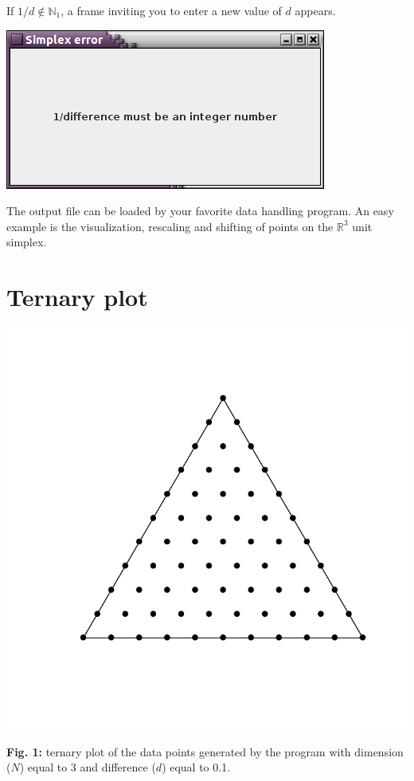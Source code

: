 \documentclass[12pt,a4paper]{article}
\begin{document}
If $1/d  \notin \mathbb{N}_1$, a frame inviting you to enter a new value of $d$ appears.

\vspace{1cm}
\centerline{\includegraphics[scale=0.6]{fig2.png}} 
\newpage
The output file can be loaded by your favorite data handling program. 
An easy example is the visualization, rescaling and shifting of points on the $\mathbb{R}^3$ unit simplex.

\section*{Ternary plot}
\centerline{\includegraphics[scale=0.5]{fig1.pdf}}
\vspace{-1cm}
\textbf{Fig. 1:} ternary plot of the data points generated by the program with dimension ($N$) equal to 3 and difference ($d$) equal to 0.1.
\end{document}
